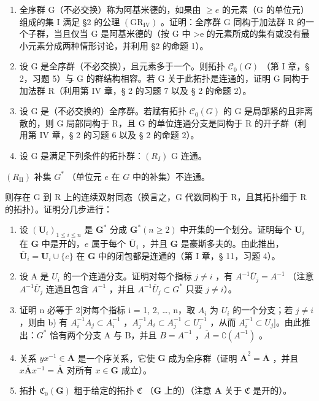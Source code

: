 \ExerciseSection

\begin{enumerate}
\def\labelenumi{\arabic{enumi})}
\item
  全序群 G（不必交换）称为阿基米德的，如果由 \(\geqslant e\) 的元素（G 的单位元）组成的集 I 满足 §2 的公理 \((\mathrm{GR}_{\mathrm{IV}})\) 。证明：全序群 G 同构于加法群 R 的一个子群，当且仅当 G 是阿基米德的（按 G 中 \textgreater e 的元素所成的集有或没有最小元素分成两种情形讨论，并利用 §2 的命题 1）。
\item
  设 G 是全序群（不必交换），且元素多于一个。则拓扑 \(\mathcal{C}_{0}(G)\) （第 I 章，§ 2，习题 5）与 G 的群结构相容。若 G 关于此拓扑是连通的，证明 G 同构于加法群 R（利用第 IV 章，§ 2 的习题 7 以及 § 2 的命题 2）。
\item
  设 G 是（不必交换的）全序群。若赋有拓扑 \(\mathcal{C}_{0}(G)\) 的 G 是局部紧的且非离散的，则 G 局部同构于 R，且 G 的单位连通分支是同构于 R 的开子群（利用第 IV 章，§ 2 的习题 6 以及 § 2 的命题 2）。
\item
  设 G 是满足下列条件的拓扑群：\((R_{I})\) G 连通。
\end{enumerate}

\((R_{\mathrm{II}})\) 补集 \(G^{*}\) （单位元 \(e\) 在 \(G\) 中的补集）不连通。

则存在 G 到 R 上的连续双射同态（换言之，G 代数同构于 R，且其拓扑细于 R 的拓扑）。证明分几步进行：

\begin{enumerate}
\def\labelenumi{\alph{enumi})}
\item
  设 \((\mathbf{U}_i)_{1 \leqslant i \leqslant n}\) 是 \(\mathbf{G}^*\) 分成 \(\mathbf{G}^* (n \geqslant 2)\) 中开集的一个划分。证明每个 \(\mathbf{U}_i\) 在 \(\mathbf{G}\) 中是开的，\(e\) 属于每个 \(\overline{\mathbf{U}}_i\) ，并且 \(\mathbf{G}\) 是豪斯多夫的。由此推出，\(\overline{\mathbf{U}}_i = \mathbf{U}_i \cup \{e\}\) 在 \(\mathbf{G}\) 中的闭包都是连通的（第 I 章，§ 11，习题 4）。
\item
  设 A 是 \(U_{i}\) 的一个连通分支。证明对每个指标 \(j \neq i\) ，有 \(A^{-1}\overline{U}_{j} = A^{-1}\) （注意 \(A^{-1}\overline{U}_{j}\) 连通且包含 \(A^{-1}\) ，并且 \(A^{-1}\overline{U}_{j} \subset G^{*}\) 只要 \(j \neq i\)）。
\item
  证明 n 必等于 2{[}对每个指标 i = 1, 2, \ldots, n，取 \(A_{i}\) 为 \(U_{i}\) 的一个分支；若 \(j \neq i\) ，则由 b) 有 \(A_{i}^{-1}A_{j} \subset A_{i}^{-1}\) ，\(A_{j}^{-1}A_{i} \subset A_{j}^{-1} \subset U_{j}^{-1}\) ，从而 \(A_{i}^{-1} \subset U_{j}\){]}。由此推出：\(G^{*}\) 恰有两个分支 A 与 B，并且 \(B = A^{-1}\) ，\(\overline{A} = \complement(A^{-1})\) 。
\item
  关系 \(yx^{-1} \in \overline{\mathbf{A}}\) 是一个序关系，它使 \(\mathbf{G}\) 成为全序群（证明 \(\overline{\mathbf{A}}^2 = \overline{\mathbf{A}}\) ，并且 \(x\overline{\mathbf{A}}x^{-1} = \overline{\mathbf{A}}\) 对所有 \(x \in \mathbf{G}\) 成立）。
\item
  拓扑 \(\mathfrak{C}_0(\mathbf{G})\) 粗于给定的拓扑 \(\mathfrak{C}\) （\(\mathbf{G}\) 上的）（注意 \(\mathbf{A}\) 关于 \(\mathfrak{C}\) 是开的）。
\end{enumerate}

